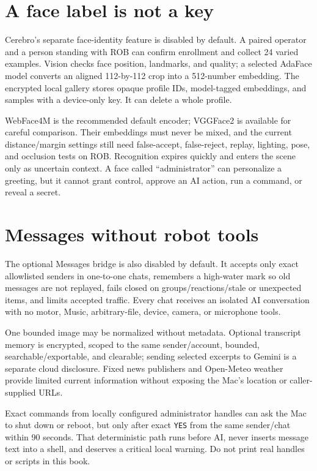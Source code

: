 \documentclass[11pt,openany]{book}
\begin{document}
\section*{A face label is not a key}

Cerebro's separate face-identity feature is disabled by default. A paired operator and a person standing with ROB can confirm enrollment and collect 24 varied examples. Vision checks face position, landmarks, and quality; a selected AdaFace model converts an aligned 112-by-112 crop into a 512-number embedding. The encrypted local gallery stores opaque profile IDs, model-tagged embeddings, and samples with a device-only key. It can delete a whole profile.

WebFace4M is the recommended default encoder; VGGFace2 is available for careful comparison. Their embeddings must never be mixed, and the current distance/margin settings still need false-accept, false-reject, replay, lighting, pose, and occlusion tests on ROB. Recognition expires quickly and enters the scene only as uncertain context. A face called ``administrator'' can personalize a greeting, but it cannot grant control, approve an AI action, run a command, or reveal a secret.

\section*{Messages without robot tools}

The optional Messages bridge is also disabled by default. It accepts only exact allowlisted senders in one-to-one chats, remembers a high-water mark so old messages are not replayed, fails closed on groups/reactions/stale or unexpected items, and limits accepted traffic. Every chat receives an isolated AI conversation with no motor, Music, arbitrary-file, device, camera, or microphone tools.

One bounded image may be normalized without metadata. Optional transcript memory is encrypted, scoped to the same sender/account, bounded, searchable/exportable, and clearable; sending selected excerpts to Gemini is a separate cloud disclosure. Fixed news publishers and Open-Meteo weather provide limited current information without exposing the Mac's location or caller-supplied URLs.

Exact commands from locally configured administrator handles can ask the Mac to shut down or reboot, but only after exact \texttt{YES} from the same sender/chat within 90 seconds. That deterministic path runs before AI, never inserts message text into a shell, and deserves a critical local warning. Do not print real handles or scripts in this book.
\end{document}

